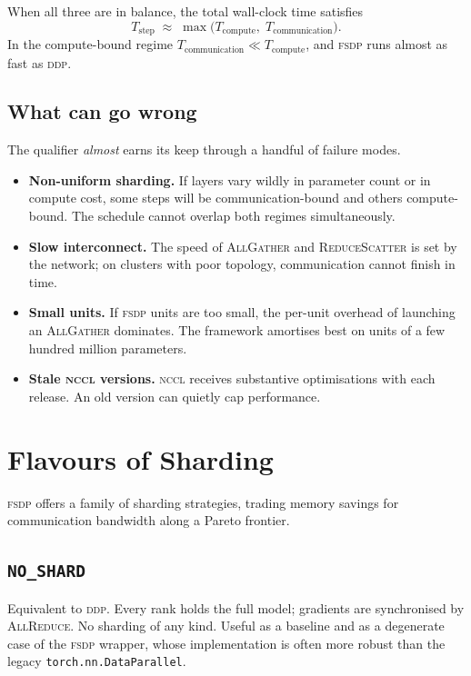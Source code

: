 \documentclass[11pt,a4paper]{article}
\theoremstyle{definition}
\theoremstyle{remark}
\newcommand{\FSDP}{\textsc{fsdp}}
\newcommand{\DDP}{\textsc{ddp}}
\newcommand{\NCCL}{\textsc{nccl}}
\newcommand{\AllGather}{\textsc{AllGather}}
\newcommand{\ReduceScatter}{\textsc{ReduceScatter}}
\newcommand{\AllReduce}{\textsc{AllReduce}}
\newcommand{\code}[1]{\texttt{\small #1}}
\begin{document}
When all three are in balance, the total wall-clock time satisfies
\[
    T_{\text{step}} \;\approx\; \max\bigl(T_{\text{compute}}, \; T_{\text{communication}}\bigr).
\]
In the compute-bound regime $T_{\text{communication}} \ll T_{\text{compute}}$, and \FSDP{} runs almost as fast as \DDP{}.

\subsection{What can go wrong}

The qualifier \emph{almost} earns its keep through a handful of failure modes.

\begin{itemize}[leftmargin=2em, itemsep=0.15em]
    \item \textbf{Non-uniform sharding.} If layers vary wildly in parameter count or in compute cost, some steps will be communication-bound and others compute-bound. The schedule cannot overlap both regimes simultaneously.
    \item \textbf{Slow interconnect.} The speed of \AllGather{} and \ReduceScatter{} is set by the network; on clusters with poor topology, communication cannot finish in time.
    \item \textbf{Small units.} If \FSDP{} units are too small, the per-unit overhead of launching an \AllGather{} dominates. The framework amortises best on units of a few hundred million parameters.
    \item \textbf{Stale \NCCL{} versions.} \NCCL{} receives substantive optimisations with each release. An old version can quietly cap performance.
\end{itemize}

\section{Flavours of Sharding}


\FSDP{} offers a family of sharding strategies, trading memory savings for communication bandwidth along a Pareto frontier.

\subsection{\texttt{NO\_SHARD}}

Equivalent to \DDP{}. Every rank holds the full model; gradients are synchronised by \AllReduce{}. No sharding of any kind. Useful as a baseline and as a degenerate case of the \FSDP{} wrapper, whose implementation is often more robust than the legacy \code{torch.nn.DataParallel}.
\end{document}
